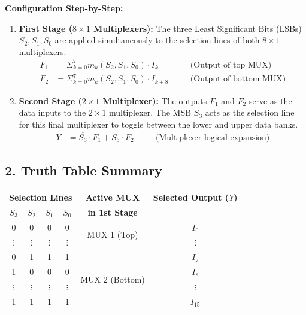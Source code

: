 \documentclass[12pt,a3paper]{article}
\begin{document}
\begin{enumerate}
\begin{tcolorbox}[enhanced,breakable,ansbox,colback=cD!4,colframe=cD,boxrule=0.8pt,arc=5pt,title={\textbf{Answer}},fonttitle=\bfseries\color{white},colbacktitle=cD]
\textbf{Configuration Step-by-Step:}
\begin{enumerate}
    \item \textbf{First Stage ($8 \times 1$ Multiplexers):} 
    The three Least Significant Bits (LSBs) $S_2, S_1, S_0$ are applied simultaneously to the selection lines of both $8 \times 1$ multiplexers. 
    \begin{align*}
        F_1 &= \Sigma_{k=0}^{7} m_k(S_2, S_1, S_0) \cdot I_k \quad &&\text{(Output of top MUX)} \\
        F_2 &= \Sigma_{k=0}^{7} m_k(S_2, S_1, S_0) \cdot I_{k+8} \quad &&\text{(Output of bottom MUX)}
    \end{align*}
    
    \item \textbf{Second Stage ($2 \times 1$ Multiplexer):}
    The outputs $F_1$ and $F_2$ serve as the data inputs to the $2 \times 1$ multiplexer. The MSB $S_3$ acts as the selection line for this final multiplexer to toggle between the lower and upper data banks.
    \begin{align*}
        Y &= \overline{S_3} \cdot F_1 + S_3 \cdot F_2 \quad &&\text{(Multiplexer logical expansion)}
    \end{align*}
\end{enumerate}

\vspace{0.4cm}
\subsection*{2. Truth Table Summary}
\begin{center}
\renewcommand{\arraystretch}{1.2}
\begin{tabular}{c | ccc | c | c}
\toprule
\multicolumn{4}{c|}{\textbf{Selection Lines}} & \textbf{Active MUX} & \textbf{Selected Output ($Y$)} \\
$S_3$ & $S_2$ & $S_1$ & $S_0$ & \textbf{in 1st Stage} & \\
\midrule
0 & 0 & 0 & 0 & \multirow{2}{*}{MUX 1 (Top)} & $I_0$ \\
$\vdots$ & $\vdots$ & $\vdots$ & $\vdots$ & & $\vdots$ \\
0 & 1 & 1 & 1 & & $I_7$ \\
\midrule
1 & 0 & 0 & 0 & \multirow{2}{*}{MUX 2 (Bottom)} & $I_8$ \\
$\vdots$ & $\vdots$ & $\vdots$ & $\vdots$ & & $\vdots$ \\
1 & 1 & 1 & 1 & & $I_{15}$ \\
\bottomrule
\end{tabular}
\end{center}


\end{tcolorbox}
\end{enumerate}
\end{document}
